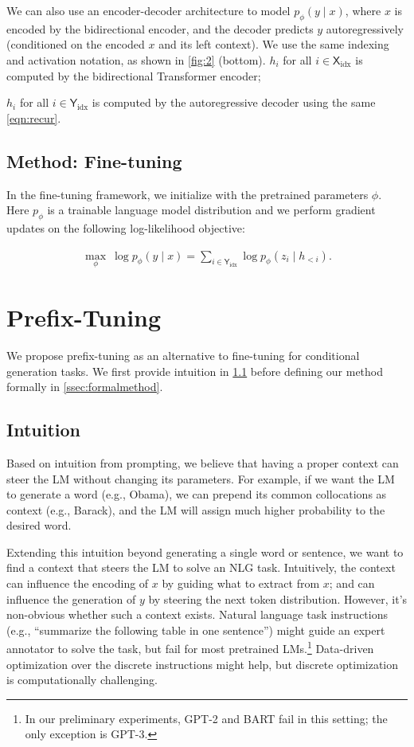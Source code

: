 We can also use an encoder-decoder architecture \citep[e.g., BART;][]{lewis-etal-2020-bart} to model $p_\phi(y\mid x)$, where $x$ is encoded by the bidirectional encoder, and the decoder predicts $y$ autoregressively (conditioned on the encoded $x$ and its left context). We use the same indexing and activation notation, as shown in \ref{fig:2} (bottom). $h_i$ for all $i \in \textsf{X$_{\text{idx}}$}$ is computed by the bidirectional Transformer encoder; 

$h_i$ for all $i \in \textsf{Y$_{\text{idx}}$}$ is computed by the autoregressive decoder using the same \ref{eqn:recur}. 

\subsection{Method: Fine-tuning} In the fine-tuning framework, we initialize with the pretrained parameters $\phi$. Here $p_{\phi}$ is a trainable language model distribution and we perform gradient updates on the following log-likelihood objective:

\begin{align}

    \max_{\phi} ~\log p_\phi(y \mid x) = \sum_{i\in \textsf{Y$_{\text{idx}}$}}  \log p_\phi(z_i \mid h_{<i}) \text{.}
    \label{eqn:loss}
\end{align}

\section{Prefix-Tuning}

We propose prefix-tuning as an alternative to fine-tuning for conditional generation tasks. We first provide intuition in \ref{ssec:intuition} before defining our method formally in \ref{ssec:formalmethod}.

\subsection{Intuition} 
\label{ssec:intuition}

Based on intuition from prompting, we believe that having a proper context can steer the LM without changing its parameters. For example, if we want the LM to generate a word (e.g., Obama), we can prepend its common collocations as context (e.g., Barack), and the LM will assign much higher probability to the desired word.

Extending this intuition beyond generating a single word or sentence, we want to find a context that steers the LM to solve an NLG task. Intuitively, the context can influence the encoding of $x$ by guiding what to extract from $x$; and can influence the generation of $y$ by steering the next token distribution. However, it's non-obvious whether such a context exists. Natural language task instructions (e.g., ``summarize the following table in one sentence'') might guide an expert annotator to solve the task, but fail for most pretrained LMs.\footnote{In our preliminary experiments, GPT-2 and BART fail in this setting; the only exception is GPT-3. } Data-driven optimization over the discrete instructions might help, but discrete optimization is computationally challenging. 

